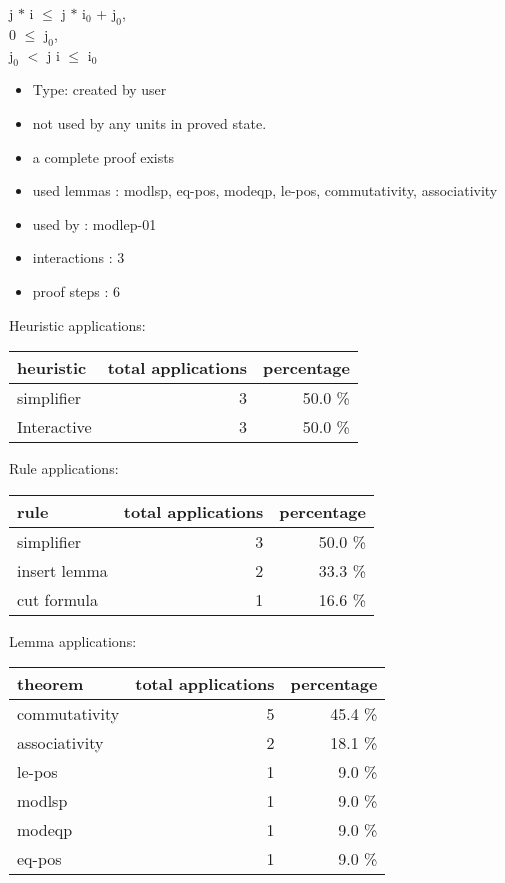\documentclass[a4paper]{article}
\begin{document}
j $*$ i $\le$ j $*$ $\mbox{i}_{0}$ + $\mbox{j}_{0}$, \\
0 $\le$ $\mbox{j}_{0}$, \\
$\mbox{j}_{0}$ $<$ j \Fol i $\le$ $\mbox{i}_{0}$

\begin{itemize}

\item Type: created by user

\item not used by any units in proved state.
\item       a complete proof exists
\item       used lemmas  : modlsp, eq-pos, modeqp, le-pos, commutativity, associativity
\item       used by      : modlep-01
\item       interactions : 3
\item       proof steps  : 6
\end{itemize}

\medskip


Heuristic applications:

\begin{supertabular}{l|r|r}
heuristic	& total applications & percentage \\ \hline
simplifier & 3 & 50.0 \% \\
Interactive & 3 & 50.0 \% \\

\end{supertabular}

Rule applications:

\begin{supertabular}{l|r|r}
rule	        & total applications & percentage \\ \hline
simplifier & 3 & 50.0 \% \\
insert lemma & 2 & 33.3 \% \\
cut formula & 1 & 16.6 \% \\

\end{supertabular}

Lemma applications:

\begin{supertabular}{l|r|r}
theorem	        & total applications & percentage \\ \hline
commutativity & 5 & 45.4 \% \\
associativity & 2 & 18.1 \% \\
le-pos & 1 & 9.0 \% \\
modlsp & 1 & 9.0 \% \\
modeqp & 1 & 9.0 \% \\
eq-pos & 1 & 9.0 \% \\

\end{supertabular}
\end{document}
